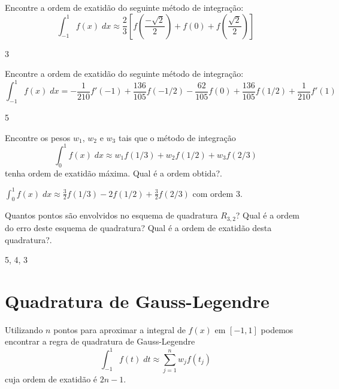 \begin{exer}
Encontre a ordem de exatidão do seguinte método de integração:
\begin{equation} \int_{-1}^1f(x)\;dx\approx \frac{2}{3}\left[f\left(\frac{-\sqrt{2}}{2}\right)+f(0)+f\left(\frac{\sqrt{2}}{2}\right)\right] \end{equation}
\end{exer}
\begin{resp}
3
\end{resp}


\begin{exer}
Encontre a ordem de exatidão do seguinte método de integração:
\begin{equation} \int_{-1}^1f(x)\;dx=-\frac{1}{210}f'(-1)+\frac{136}{105} f(-1/2) - \frac{62}{105} f(0) + \frac{136}{105}f(1/2) +\frac{1}{210}f'(1) \end{equation}
\end{exer}
\begin{resp}
5
\end{resp}

\begin{exer} Encontre os pesos $w_1$, $w_2$ e $w_3$ tais que o método de integração
\begin{equation} \int_0^1 f(x)\;dx \approx w_1 f(1/3)  + w_2f(1/2) + w_3f(2/3) \end{equation}
tenha ordem de exatidão máxima. Qual é a ordem obtida?.
\end{exer}
\begin{resp}
$\int_0^1 f(x)\;dx \approx \frac{3}{2} f(1/3)  -2f(1/2) + \frac{3}{2}f(2/3)$ com ordem 3.
\end{resp}

\begin{exer}
Quantos pontos são envolvidos no esquema de quadratura $R_{3,2}$? Qual é a ordem do erro deste esquema de quadratura? Qual é a ordem de exatidão desta quadratura?.
\end{exer}
\begin{resp}
 5, 4, 3
\end{resp}


\section{Quadratura de Gauss-Legendre}

Utilizando $n$ pontos para aproximar a integral de $f(x)$ em $[-1,1]$ podemos encontrar a regra de quadratura de Gauss-Legendre
\begin{equation} \int_{-1}^1 f(t)\;dt \approx \sum_{j=1}^n w_j f(t_j) \end{equation}
cuja ordem de exatidão é $2n-1$.

